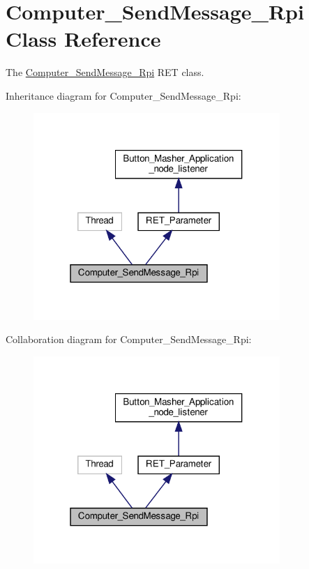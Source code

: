 \hypertarget{classRET__socket_1_1Computer__SendMessage__Rpi}{}\section{Computer\+\_\+\+Send\+Message\+\_\+\+Rpi Class Reference}
\label{classRET__socket_1_1Computer__SendMessage__Rpi}


The \hyperlink{classRET__socket_1_1Computer__SendMessage__Rpi}{Computer\+\_\+\+Send\+Message\+\_\+\+Rpi} R\+ET class.  




Inheritance diagram for Computer\+\_\+\+Send\+Message\+\_\+\+Rpi\+:
\nopagebreak
\begin{figure}[H]
\begin{center}
\leavevmode
\includegraphics[width=265pt]{classRET__socket_1_1Computer__SendMessage__Rpi__inherit__graph}
\end{center}
\end{figure}


Collaboration diagram for Computer\+\_\+\+Send\+Message\+\_\+\+Rpi\+:
\nopagebreak
\begin{figure}[H]
\begin{center}
\leavevmode
\includegraphics[width=265pt]{classRET__socket_1_1Computer__SendMessage__Rpi__coll__graph}
\end{center}
\end{figure}
